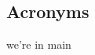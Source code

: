 \documentclass[12pt,oneside,oldfontcommands]{memoir}
\def\bibliostyle{plain}
\begin{document}
\begin{appendices}


\chapter{Acronyms  }
\label{sec_acros}

\printglossary[type=\acronymtype]

\end{appendices}

% 
%
%


\if@mainmatter
	we're in main
	\backmatter
\fi



\ifx\bibliocommand\undefined
\else
	
	\bibliocommand
\fi






\end{document}
